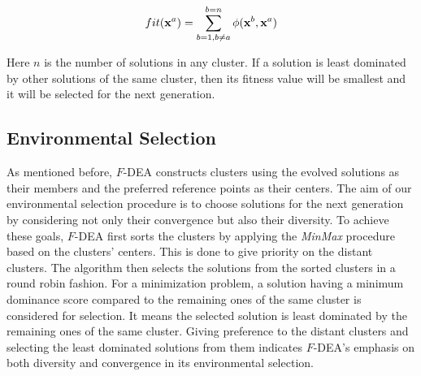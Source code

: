 \documentclass[review]{elsarticle}
\begin{document}
\begin{equation} \label{eq:fitassign}
fit(\textbf{x}^a)=  \sum_{b=1, b\neq a}^{b=n} \phi(\textbf{x}^b,\textbf{x}^a)\\
\end{equation}

\noindent Here $n$ is the number of solutions in any cluster. If a solution is least dominated by other solutions of the same
cluster, then its fitness value will be smallest and it will be selected for the next generation.

%

\subsection{Environmental Selection}
As mentioned before, $F$-DEA constructs clusters using the evolved solutions as their members and the preferred reference points as their centers. 
 The aim of our environmental selection procedure is to choose solutions for the next generation by considering not only their convergence but also their diversity. 
To achieve these goals, $F$-DEA first sorts the clusters by applying the {\it MinMax} procedure based on the clusters' centers.
This is done to give priority on the distant clusters. The algorithm
then selects the solutions from the sorted clusters in a round robin fashion. For a minimization problem,  a solution having a minimum 
dominance score compared to the remaining  ones of the same cluster is considered for selection. 
It means the selected solution is least dominated by the remaining ones of the same cluster. Giving preference to the distant clusters and selecting the least dominated solutions from them indicates $F$-DEA's emphasis on both diversity and convergence in its environmental selection. 
\end{document}
